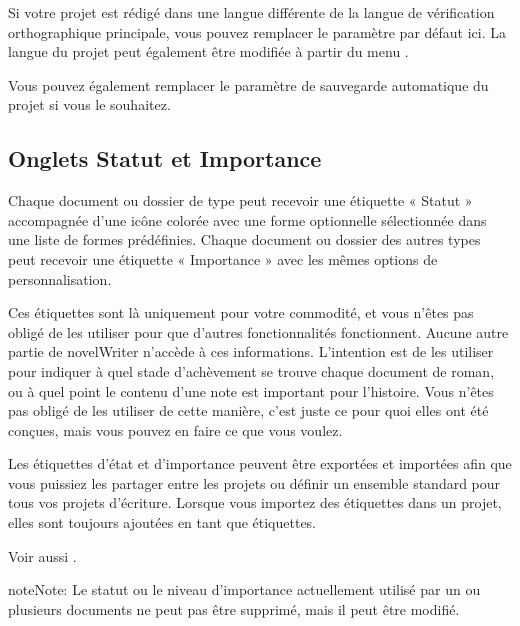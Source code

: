 \documentclass[a4paper,11pt,french]{sphinxmanual}
\begin{document}
\sphinxAtStartPar
Si votre projet est rédigé dans une langue différente de la langue de vérification orthographique principale, vous pouvez remplacer le paramètre par défaut ici. La langue du projet peut également être modifiée à partir du menu .

\sphinxAtStartPar
Vous pouvez également remplacer le paramètre de sauvegarde automatique du projet si vous le souhaitez.


\subsection{Onglets Statut et Importance}
\label{\detokenize{project_overview:status-and-importance-tabs}}
\sphinxAtStartPar
Chaque document ou dossier de type  peut recevoir une étiquette « Statut » accompagnée d’une icône colorée avec une forme optionnelle sélectionnée dans une liste de formes prédéfinies. Chaque document ou dossier des autres types peut recevoir une étiquette « Importance » avec les mêmes options de personnalisation.

\sphinxAtStartPar
Ces étiquettes sont là uniquement pour votre commodité, et vous n’êtes pas obligé de les utiliser pour que d’autres fonctionnalités fonctionnent. Aucune autre partie de novelWriter n’accède à ces informations. L’intention est de les utiliser pour indiquer à quel stade d’achèvement se trouve chaque document de roman, ou à quel point le contenu d’une note est important pour l’histoire. Vous n’êtes pas obligé de les utiliser de cette manière, c’est juste ce pour quoi elles ont été conçues, mais vous pouvez en faire ce que vous voulez.

\sphinxAtStartPar
Les étiquettes d’état et d’importance peuvent être exportées et importées afin que vous puissiez les partager entre les projets ou définir un ensemble standard pour tous vos projets d’écriture. Lorsque vous importez des étiquettes dans un projet, elles sont toujours ajoutées en tant que  étiquettes.

\sphinxAtStartPar
Voir aussi {\hyperref[\detokenize{usage_project:a-ui-tree-status}]{}}.

\begin{sphinxadmonition}{note}{Note:}
\sphinxAtStartPar
Le statut ou le niveau d’importance actuellement utilisé par un ou plusieurs documents ne peut pas être supprimé, mais il peut être modifié.
\end{sphinxadmonition}
\end{document}
